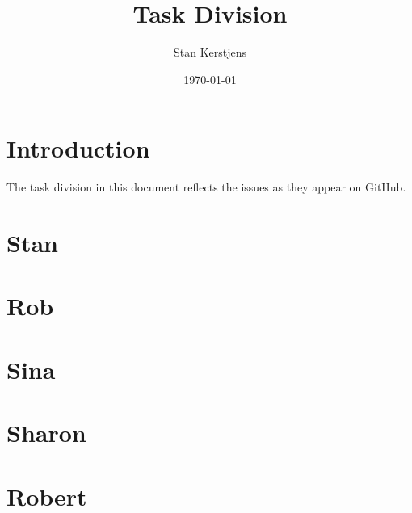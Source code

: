 \documentclass[a4paper]{article}
\title{Task Division}
\author{Stan Kerstjens}
\date{\today}
\begin{document}
	\maketitle

	\section{Introduction}
		The task division in this document reflects the issues as they appear on GitHub.
	
	\tableofcontents
	
	\section{Stan}
		
	\section{Rob}
		
	\section{Sina}
		
	\section{Sharon}
		
	\section{Robert}
		
\end{document}
